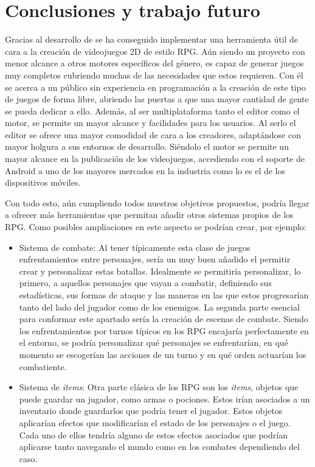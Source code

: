 \chapter{Conclusiones y trabajo futuro}
\label{cap:trabajoFuturo}

Gracias al desarrollo de \baker{} se ha conseguido implementar una herramienta útil de cara a la creación de videojuegos 2D de estilo RPG. Aún siendo un proyecto con menor alcance a otros motores específicos del género, es capaz de generar juegos muy completos cubriendo muchas de las necesidades que estos requieren. Con él se acerca a un público sin experiencia en programación a la creación de este tipo de juegos de forma libre, abriendo las puertas a que una mayor cantidad de gente se pueda dedicar a ello. Además, al ser multiplataforma tanto el editor como el motor, se permite un mayor alcance y facilidades para los usuarios. Al serlo el editor se ofrece una mayor comodidad de cara a los creadores, adaptándose con mayor holgura a sus entornos de desarrollo. Siéndolo el motor se permite un mayor alcance en la publicación de los videojuegos, accediendo con el soporte de Android a uno de los mayores mercados en la industria como lo es el de los dispositivos móviles.

\medskip  

Con todo esto, aún cumpliendo todos nuestros objetivos propuestos, \baker{} podría llegar a ofrecer más herramientas que permitan añadir otros sistemas propios de los RPG. Como posibles ampliaciones en este aspecto se podrían crear, por ejemplo:
\begin{itemize}
	\item Sistema de combate: Al tener típicamente esta clase de juegos enfrentamientos entre personajes, sería un muy buen añadido el permitir crear y personalizar estas batallas. Idealmente se permitiría personalizar, lo primero, a aquellos personajes que vayan a combatir, definiendo sus estadísticas, sus formas de ataque y las maneras en las que estos progresarían tanto del lado del jugador como de los enemigos. La segunda parte esencial para conformar este apartado sería la creación de escenas de combate. Siendo los enfrentamientos por turnos típicos en los RPG encajaría perfectamente en el entorno, se podría personalizar qué personajes se enfrentarían, en qué momento se escogerían las acciones de un turno y en qué orden actuarían los combatiente.
	\item Sistema de \textit{items}: Otra parte clásica de los RPG son los \textit{items}, objetos que puede guardar un jugador, como armas o pociones. Estos irían asociados a un inventario donde guardarlos que podría tener el jugador. Estos objetos aplicarían efectos que modificarían el estado de los personajes o el juego. Cada uno de ellos tendría alguno de estos efectos asociados que podrían aplicarse tanto navegando el mundo como en los combates dependiendo del caso.
\end{itemize}

